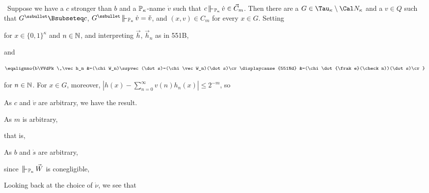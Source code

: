 {\noindent\Prf\ Suppose we have a $c$ stronger than $b$ and a $\Bbb P_{\kappa}$-name
$\dot v$ such that $c\VVdPk\,\dot v\in\vec C_m$.   Then there are a
$G\in\Tau_{\kappa}\setminus\Cal N_{\kappa}$ and a $v\in Q$ such that
$G^{\ssbullet}\Bsubseteq c$, $G^{\ssbullet}\VVdPk\,\dot v=\check v$,
and $(x,v)\in C_m$ for every $x\in G$.   Setting


\noindent for $x\in\{0,1\}^{\kappa}$ and $n\in\Bbb N$, and interpreting
$\vec h$, $\vec h_n$ as in 551B,


\noindent and

$$\eqalignno{b\VVdPk\,\vec h_n
&=(\chi W_n)\sspvec(\dot s)=(\chi\vec W_n)(\dot s)\cr
\displaycause{551Nd}
&=(\chi\dot{\frak e}(\check n))(\dot s)\cr}$$

\noindent for $n\in\Bbb N$.
For $x\in G$, moreover,
$|h(x)-\sum_{n=0}^{\infty}v(n)h_n(x)|\le 2^{-m}$, so


\noindent As $c$ and $\dot v$ are arbitrary, we have the result.\ \Qed

\medskip

 As $m$ is arbitrary,


\noindent that is,


\noindent As $b$ and $\dot s$ are arbitrary,


\noindent since $\VVdPk\,\vec W$ is conegligible,


\noindent Looking back at the choice of $\dot\nu$, we see that

}
